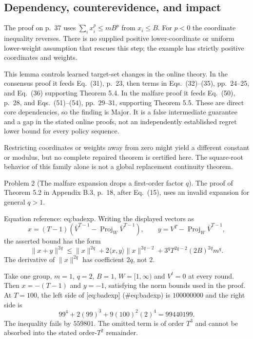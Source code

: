 \documentclass[10pt]{article}
\begin{document}
\subsection*{Dependency, counterevidence, and impact}
The proof on p. 37 uses \(\sum_i x_i^p\le mB^p\) from \(x_i\le B\). For \(p<0\) the coordinate inequality reverses. There is no supplied positive lower-coordinate or uniform lower-weight assumption that rescues this step; the example has strictly positive coordinates and weights.\par
This lemma controls learned target-set changes in the online theory. In the consensus proof it feeds Eq. (31), p. 23, then terms in Eqs. (32)–(35), pp. 24–25, and Eq. (36) supporting Theorem 5.4. In the malfare proof it feeds Eq. (50), p. 28, and Eqs. (51)–(54), pp. 29–31, supporting Theorem 5.5. These are direct core dependencies, so the finding is Major. It is a false intermediate guarantee and a gap in the stated online proofs, not an independently established regret lower bound for every policy sequence.\par
Restricting coordinates or weights away from zero might yield a different constant or modulus, but no complete repaired theorem is certified here. The square-root behavior of this family alone is not a global replacement continuity theorem.\par
Problem 2 (The malfare expansion drops a first-order factor \(q\)).  The proof of Theorem 5.2 in Appendix B.3, p. 18, after Eq. (15), uses an invalid expansion for general \(q>1\).\par
Equation reference: eq:badexp. Writing the displayed vectors as \[x=(T-1)(\bar V^{T-1}-\operatorname{Proj}_{W}\bar V^{T-1}),
 \qquad y=V^T-\operatorname{Proj}_{W}\bar V^{T-1},\] the asserted bound has the form \[\|x+y\|^{2q}\le\|x\|^{2q}
 +2\langle x,y\rangle\|x\|^{2q-2}
 +3^q T^{2q-2}(2B)^{2q}m^q. \] The derivative of \(\|x\|^{2q}\) has coefficient \(2q\), not \(2\).\par
Take one group, \(m=1\), \(q=2\), \(B=1\), \(W=[1,\infty)\) and \(V^t=0\) at every round. Then \(x=-(T-1)\) and \(y=-1\), satisfying the norm bounds used in the proof. At \(T=100\), the left side of [eq:badexp] (\#eq:badexp) is \(100000000\) and the right side is \[99^4+2(99)^3+9(100)^2(2)^4=99440199.\] The inequality fails by \(559801\). The omitted term is of order \(T^3\) and cannot be absorbed into the stated order-\(T^2\) remainder.\par
\end{document}
